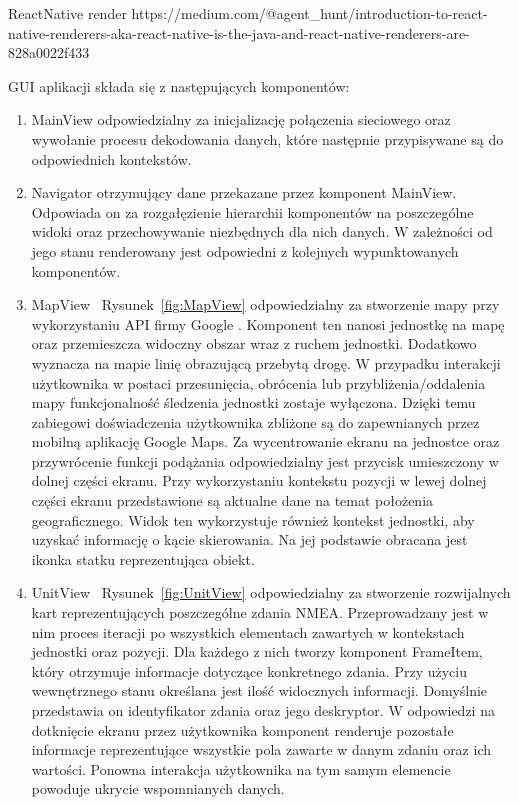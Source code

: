 \documentclass[skorowidz,skroty]{dyplomWEZUT}
\begin{document}
{ReactNative render \label{fig:react-native-renderer}}
{https://medium.com/@agent\_hunt/introduction-to-react-native-renderers-aka-react-native-is-the-java-and-react-native-renderers-are-828a0022f433}
 
	 GUI aplikacji składa się z następujących komponentów:
\begin{enumerate}

\item MainView odpowiedzialny za inicjalizację połączenia sieciowego oraz wywołanie  procesu dekodowania danych, które następnie przypisywane są do odpowiednich kontekstów.

\item Navigator otrzymujący dane przekazane przez komponent MainView. Odpowiada on za rozgałęzienie hierarchii komponentów na poszczególne widoki oraz przechowywanie niezbędnych dla nich danych. W zależności od jego stanu renderowany jest odpowiedni z kolejnych wypunktowanych komponentów.

\item MapView ~Rysunek~\ref{fig:MapView} odpowiedzialny za stworzenie mapy przy wykorzystaniu API firmy Google  . Komponent ten nanosi jednostkę na mapę oraz przemieszcza widoczny obszar wraz z ruchem jednostki. Dodatkowo wyznacza na mapie linię obrazującą przebytą drogę. W przypadku interakcji użytkownika w postaci przesunięcia, obrócenia lub przybliżenia/oddalenia mapy funkcjonalność śledzenia jednostki zostaje wyłączona. Dzięki temu zabiegowi doświadczenia użytkownika zbliżone są do zapewnianych przez mobilną aplikację Google Maps. Za wycentrowanie ekranu na jednostce oraz przywrócenie funkcji podążania odpowiedzialny jest przycisk umieszczony w dolnej części ekranu. Przy wykorzystaniu kontekstu pozycji w lewej dolnej części ekranu przedstawione są aktualne dane na temat położenia geograficznego. Widok ten wykorzystuje również kontekst jednostki, aby uzyskać informację o kącie skierowania. Na jej podstawie obracana jest ikonka statku reprezentująca obiekt.

\item UnitView ~Rysunek~\ref{fig:UnitView} odpowiedzialny za stworzenie rozwijalnych kart reprezentujących poszczególne zdania NMEA. Przeprowadzany jest w nim proces iteracji po wszystkich elementach zawartych w kontekstach jednostki oraz pozycji. Dla każdego z nich tworzy komponent FrameItem, który otrzymuje informacje dotyczące konkretnego zdania. Przy użyciu wewnętrznego stanu określana jest ilość widocznych informacji. Domyślnie przedstawia on identyfikator zdania oraz jego deskryptor. W odpowiedzi na dotknięcie ekranu przez użytkownika komponent renderuje pozostałe informacje reprezentujące wszystkie pola zawarte w danym zdaniu oraz ich wartości. Ponowna interakcja użytkownika na tym samym elemencie powoduje ukrycie wspomnianych danych.


\end{enumerate}
\end{document}
